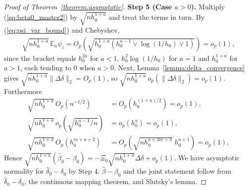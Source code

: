 \documentclass{article}
\newcommand{\normm}[1]{\lVert#1\rVert}
\newcommand{\E}{\mathbb{E}}
\begin{document}
\begin{appendices}
\begin{proof}[Proof of Theorem~\ref{theorem:asymptotic}]
\textbf{Step 5 (Case $a>0$).}
Multiply (\ref{eq:beta0_master2}) by $\sqrt{nh_0^{1+a}}$ and treat the terms in
turn. By (\ref{eq:psi_var_bound}) and Chebyshev,
\begin{align*}
    \sqrt{nh_0^{1+a}}\,\E_n\psi_i
    = O_p\!\left(\sqrt{h_0^{1+a}\left(h_0^{a-1}\vee\log(1/h_0)\vee1\right)}\right)
    = o_p(1),
\end{align*}
since the bracket equals $h_0^{2a}$ for $a<1$, $h_0^{2}\log(1/h_0)$ for $a=1$
and $h_0^{1+a}$ for $a>1$, each tending to $0$ when $a>0$. Next, Lemma~\ref{lemma:delta_convergence} gives
$\sqrt{nh_0^{1+a}}\normm{\Delta\delta}_2=O_p(1)$, so
$\sqrt{nh_0^{1+a}}\,o_p(\normm{\Delta\delta}_2)=o_p(1)$. Furthermore
\begin{align*}
    \sqrt{nh_0^{1+a}}\,O_p\!\left(n^{-1/2}\right)&=O_p\!\left(h_0^{(1+a)/2}\right)=o_p(1),\\
    \sqrt{nh_0^{1+a}}\,o_p\!\left(\sqrt{h_0^{a-1}/n}\right)&=o_p\!\left(h_0^{a}\right)=o_p(1),\\
    \sqrt{nh_0^{1+a}}\,O_p\!\left(h_0^{m+a+2}\right)
    &=O_p\!\left(\sqrt{nh_0^{a+2m+3}}\;h_0^{a+1}\right)=o_p(1),
\end{align*}
Hence $\sqrt{nh_0^{1+a}}(\hat\beta_0-\beta_0)
=-\Xi_0\sqrt{nh_0^{1+a}}\Delta\delta+o_p(1)$.
We have asymptotic normality for $\hat{\delta}_0-\delta_0$ by Step 4. 
$\hat{\beta}-\beta_0$ and the joint statement follow from $\hat{\delta}_0-\delta_0$,
 the continuous mapping theorem, and Slutsky's lemma.



\end{proof}
\end{appendices}
\end{document}
